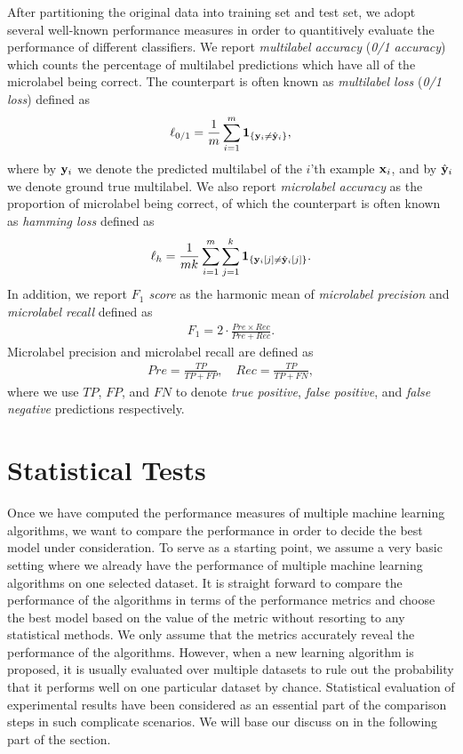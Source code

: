 {After partitioning the original data into training set and test set, we adopt several well-known performance measures in order to quantitively evaluate the performance of different classifiers.
We report \textit{multilabel accuracy} (\textit{0/1 accuracy}) which counts the percentage of multilabel predictions which have all of the microlabel being correct.
The counterpart is often known as \textit{multilabel loss} (\textit{0/1 loss}) defined as
\begin{align*}
	\ell_{0/1} = \frac{1}{m}\sum_{i=1}^{m}\mathbf{1}_{\{\mathbf {y}_i \neq \hat{\mathbf {y}}_i\}},
\end{align*}
where by $\mathbf {y}_i$ we denote the predicted multilabel of the $i$'th example $\mathbf {x}_i$, and by $\hat{\mathbf {y}}_i$ we denote ground true multilabel.
We also report \textit{microlabel accuracy} as the proportion of microlabel being correct, of which the counterpart is often known as \textit{hamming loss} defined as
\begin{align*}
	\ell_{h} = \frac{1}{mk}\sum_{i=1}^{m}\sum_{j=1}^{k}\mathbf{1}_{\{\mathbf {y}_i[j] \neq \hat{\mathbf {y}}_i[j]\}}.
\end{align*}
In addition, we report \textit{$F_1$ score} as the harmonic mean of \textit{microlabel precision} and \textit{microlabel recall} defined as
\begin{align*}
	F_1 = 2\cdot\frac{Pre\times Rec}{Pre+Rec}.
\end{align*}
Microlabel precision and microlabel recall are defined as
\begin{align*}
	Pre = \frac{TP}{TP+FP}, \quad Rec = \frac{TP}{TP+FN},
\end{align*}
where we use $TP$, $FP$, and $FN$ to denote \textit{true positive}, \textit{false positive}, and \textit{false negative} predictions respectively.


%

\section{Statistical Tests} \label{sc_st}

Once we have computed the performance measures of multiple machine learning algorithms, we want to compare the performance in order to decide the best model under consideration. 
To serve as a starting point, we assume a very basic setting where we already have the performance of multiple machine learning algorithms on one selected dataset.
It is straight forward to compare the performance of the algorithms in terms of the performance metrics and choose the best model based on the value of the metric without resorting to any statistical methods.
We only assume that the metrics accurately reveal the performance of the algorithms.
However, when a new learning algorithm is proposed, it is usually evaluated over multiple datasets to rule out the probability that it performs well on one particular dataset by chance.
Statistical evaluation of experimental results have been considered as an essential part of the comparison steps in such complicate scenarios.
We will base our discuss on \citep{Demsar06statistical,Garcia08an} in the following part of the section.

}
